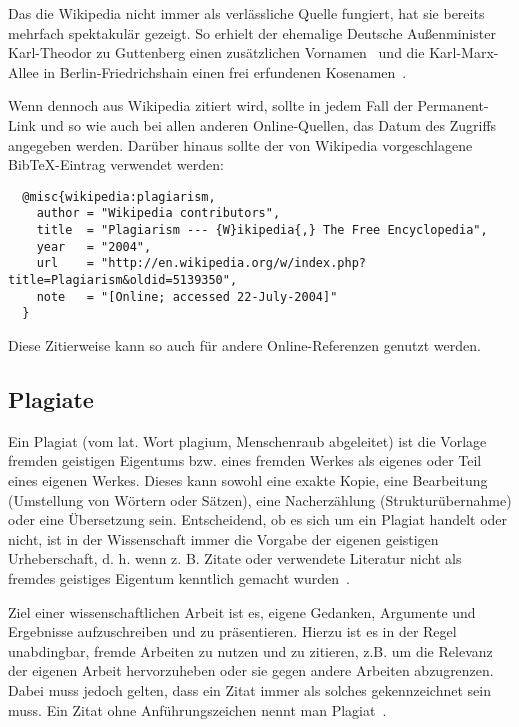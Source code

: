 Das die Wikipedia nicht immer als verlässliche Quelle fungiert, hat sie bereits mehrfach spektakulär gezeigt. So erhielt der ehemalige Deutsche Außenminister Karl-Theodor zu Guttenberg einen zusätzlichen Vornamen~\cite{bildblog:guttenberg, spiegel:guttenberg} und die Karl-Marx-Allee in Berlin-Friedrichshain einen frei erfundenen Kosenamen~\cite{rundschau:wikipedia}.

Wenn dennoch aus Wikipedia zitiert wird, sollte in jedem Fall der Permanent-Link und so wie auch bei allen anderen Online-Quellen, das Datum des Zugriffs angegeben werden. Darüber hinaus sollte der von Wikipedia vorgeschlagene BibTeX-Eintrag verwendet werden:

\begin{lstlisting}
  @misc{wikipedia:plagiarism,
    author = "Wikipedia contributors",
    title  = "Plagiarism --- {W}ikipedia{,} The Free Encyclopedia",
    year   = "2004",
    url    = "http://en.wikipedia.org/w/index.php?title=Plagiarism&oldid=5139350",
    note   = "[Online; accessed 22-July-2004]"
  }
\end{lstlisting}
\smallskip

Diese Zitierweise kann so auch für andere Online-Referenzen genutzt werden.

\subsection{Plagiate}\label{sec:citations:plagiarism}
%
Ein Plagiat (vom lat. Wort plagium, \glqq Menschenraub\grqq{} abgeleitet) ist die Vorlage fremden geistigen Eigentums bzw. eines fremden Werkes als eigenes oder Teil eines eigenen Werkes. Dieses kann sowohl eine exakte Kopie, eine Bearbeitung (Umstellung von Wörtern oder Sätzen), eine Nacherzählung (Strukturübernahme) oder eine Übersetzung sein. Entscheidend, ob es sich um ein Plagiat handelt oder nicht, ist in der Wissenschaft immer die Vorgabe der eigenen geistigen Urheberschaft, d. h. wenn z. B. Zitate oder verwendete Literatur nicht als fremdes geistiges Eigentum kenntlich gemacht wurden~\cite{wikipedia:plagiarism, wulff:2013:01}.

Ziel einer wissenschaftlichen Arbeit ist es, eigene Gedanken, Argumente und Ergebnisse aufzuschreiben und zu präsentieren. Hierzu ist es in der Regel unabdingbar, fremde Arbeiten zu nutzen und zu zitieren, z.B. um die Relevanz der eigenen Arbeit hervorzuheben oder sie gegen andere Arbeiten abzugrenzen. Dabei muss jedoch gelten, dass ein Zitat immer als solches gekennzeichnet sein muss. Ein \glqq Zitat ohne Anführungszeichen\grqq{} nennt man Plagiat~\cite{eco:2010:01}.

